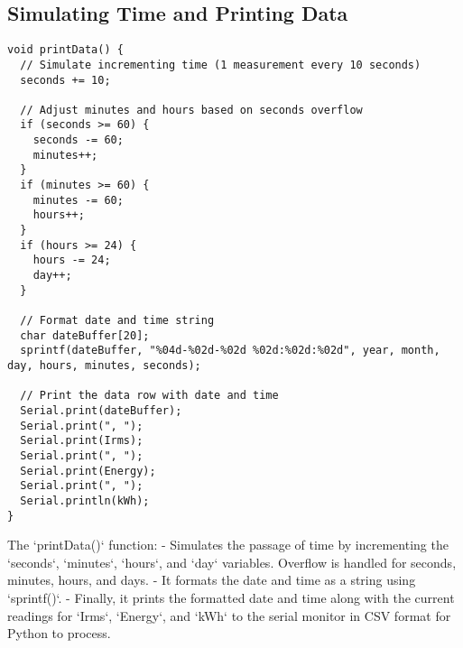 \subsection{Simulating Time and Printing Data}
\begin{lstlisting}[style=Arduino]
void printData() {
  // Simulate incrementing time (1 measurement every 10 seconds)
  seconds += 10; 

  // Adjust minutes and hours based on seconds overflow
  if (seconds >= 60) {
    seconds -= 60;
    minutes++;
  }
  if (minutes >= 60) {
    minutes -= 60;
    hours++;
  }
  if (hours >= 24) {
    hours -= 24;
    day++;
  }

  // Format date and time string
  char dateBuffer[20];
  sprintf(dateBuffer, "%04d-%02d-%02d %02d:%02d:%02d", year, month, day, hours, minutes, seconds);

  // Print the data row with date and time
  Serial.print(dateBuffer);
  Serial.print(", ");
  Serial.print(Irms);
  Serial.print(", ");
  Serial.print(Energy);
  Serial.print(", ");
  Serial.println(kWh);
}
\end{lstlisting}

The `printData()` function:
- Simulates the passage of time by incrementing the `seconds`, `minutes`, `hours`, and `day` variables. Overflow is handled for seconds, minutes, hours, and days.
- It formats the date and time as a string using `sprintf()`.
- Finally, it prints the formatted date and time along with the current readings for `Irms`, `Energy`, and `kWh` to the serial monitor in CSV format for Python to process.
